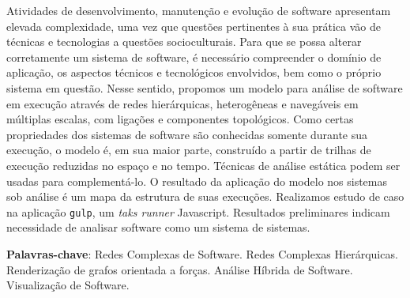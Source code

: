 
%
%

\begin{resumo}
    Atividades de desenvolvimento, manutenção e evolução de software apresentam
    elevada complexidade, uma vez que questões pertinentes à sua prática vão de
    técnicas e tecnologias a questões socioculturais.
	Para que se possa alterar corretamente um sistema de software, é necessário
	compreender o domínio de aplicação, os aspectos técnicos e tecnológicos
	envolvidos, bem como o próprio sistema em questão.
	Nesse sentido, propomos um modelo para análise de software em execução
	através de redes hierárquicas, heterogêneas e navegáveis em múltiplas
	escalas, com ligações e componentes topológicos.
	Como certas propriedades dos sistemas de software são conhecidas somente
	durante sua execução, o modelo é, em sua maior parte, construído a partir de
	trilhas de execução reduzidas no espaço e no tempo.
	Técnicas de análise estática podem ser usadas para complementá-lo.
	O resultado da aplicação do modelo nos sistemas sob análise é um mapa da
	estrutura de suas execuções.
	Realizamos estudo de caso na aplicação \texttt{gulp}, um
	\textit{taks runner} Javascript.
	Resultados preliminares indicam necessidade de analisar software como um
	sistema de sistemas.

    \textbf{Palavras-chave}:
	Redes Complexas de Software.
	Redes Complexas Hierárquicas.
	Renderização de grafos orientada a forças.
    Análise Híbrida de Software.
	Visualização de Software. 
\end{resumo}
